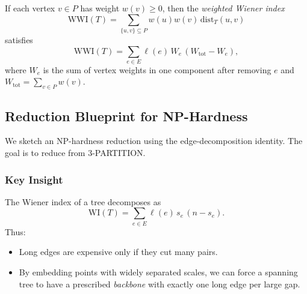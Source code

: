 \documentclass{article}
\begin{document}
\begin{corollary}
	If each vertex $v\in P$ has weight $w(v)\ge 0$, then the \emph{weighted Wiener index}
	\[
		\mathrm{WWI}(T) = \sum_{\{u,v\}\subseteq P} w(u)w(v)\,\mathrm{dist}_T(u,v)
	\]
	satisfies
	\[
		\mathrm{WWI}(T) = \sum_{e\in E}\ell(e)\,W_e\,(W_{\mathrm{tot}}-W_e),
	\]
	where $W_e$ is the sum of vertex weights in one component after removing $e$ and $W_{\mathrm{tot}}=\sum_{v\in P}w(v)$.
\end{corollary}

\subsection{Reduction Blueprint for NP-Hardness}

We sketch an NP-hardness reduction using the edge-decomposition identity. The goal is to reduce from 3-PARTITION.

\subsubsection{Key Insight}
The Wiener index of a tree decomposes as
\[
	\mathrm{WI}(T) = \sum_{e\in E}\ell(e)\,s_e\,(n-s_e).
\]
Thus:
\begin{itemize}
	\item Long edges are expensive only if they cut many pairs.
	\item By embedding points with widely separated scales, we can force a spanning tree to have a prescribed \emph{backbone} with exactly one long edge per large gap.
\end{itemize}
\end{document}
